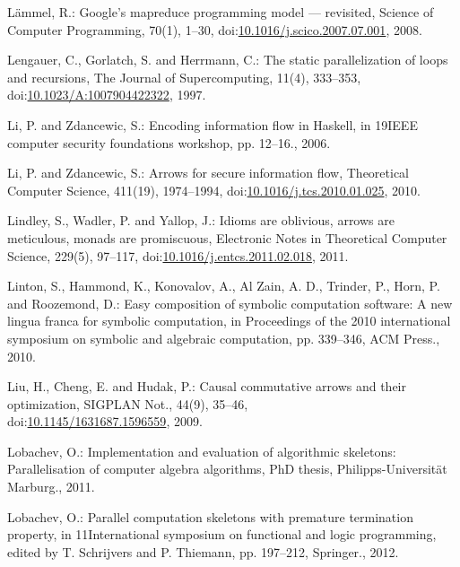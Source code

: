 \documentclass[paper=A4,twoside=true,openright,parskip=full,chapterprefix=true,headings=normal,bibliography=totoc,listof=totoc,titlepage=on,captions=tableabove,draft=false,british]{scrreprt}%
\begin{document}
\leavevmode\hypertarget{ref-LAMMEL20081}{}%
Lämmel, R.: Google's mapreduce programming model --- revisited, Science
of Computer Programming, 70(1), 1--30,
doi:\href{https://doi.org/10.1016/j.scico.2007.07.001}{10.1016/j.scico.2007.07.001},
2008.

\leavevmode\hypertarget{ref-Lengauer1997}{}%
Lengauer, C., Gorlatch, S. and Herrmann, C.: The static parallelization
of loops and recursions, The Journal of Supercomputing, 11(4), 333--353,\\
doi:\href{https://doi.org/10.1023/A:1007904422322}{10.1023/A:1007904422322},
1997.

\leavevmode\hypertarget{ref-1648705}{}%
Li, P. and Zdancewic, S.: Encoding information flow in Haskell, in
19IEEE computer security foundations workshop, pp. 12--16., 2006.

\leavevmode\hypertarget{ref-LI20101974}{}%
Li, P. and Zdancewic, S.: Arrows for secure information flow,
Theoretical Computer Science, 411(19), 1974--1994,
doi:\href{https://doi.org/10.1016/j.tcs.2010.01.025}{10.1016/j.tcs.2010.01.025},
2010.

\leavevmode\hypertarget{ref-LINDLEY201197}{}%
Lindley, S., Wadler, P. and Yallop, J.: Idioms are oblivious, arrows are
meticulous, monads are promiscuous, Electronic Notes in Theoretical
Computer Science, 229(5), 97--117,
doi:\href{https://doi.org/10.1016/j.entcs.2011.02.018}{10.1016/j.entcs.2011.02.018},
2011.

\leavevmode\hypertarget{ref-scscp}{}%
Linton, S., Hammond, K., Konovalov, A., Al Zain, A. D., Trinder, P.,
Horn, P. and Roozemond, D.: Easy composition of symbolic computation
software: A new lingua franca for symbolic computation, in Proceedings
of the 2010 international symposium on symbolic and algebraic
computation, pp. 339--346, ACM Press., 2010.

\leavevmode\hypertarget{ref-Liu:2009:CCA:1631687.1596559}{}%
Liu, H., Cheng, E. and Hudak, P.: Causal commutative arrows and their
optimization, SIGPLAN Not., 44(9), 35--46,\\
doi:\href{https://doi.org/10.1145/1631687.1596559}{10.1145/1631687.1596559},
2009.

\leavevmode\hypertarget{ref-lobachev-phd}{}%
Lobachev, O.: Implementation and evaluation of algorithmic skeletons:
Parallelisation of computer algebra algorithms, PhD thesis,
Philipps-Universität Marburg., 2011.

\leavevmode\hypertarget{ref-Lobachev2012}{}%
Lobachev, O.: Parallel computation skeletons with premature termination
property, in 11International symposium on functional and logic
programming, edited by T. Schrijvers and P. Thiemann, pp. 197--212,
Springer., 2012.
\end{document}

